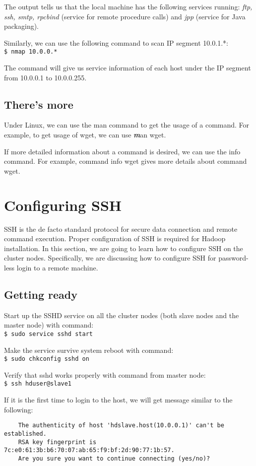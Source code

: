 The output tells us that the local machine has the following services running: \emph{ftp, ssh, smtp, rpcbind} (service for remote procedure calls) and \emph{jpp} (service for Java packaging).

Similarly, we can use the following command to scan IP segment 10.0.1.*: \\
\verb|$ nmap 10.0.0.*|

The command will give us service information of each host under the IP segment from 10.0.0.1 to 10.0.0.255.

\subsection*{There's more}
Under Linux, we can use the man command to get the usage of a command. For example, to get usage of wget, we can use {\emph \textbf man wget}.

If more detailed information about a command is desired, we can use the info command. For example, command info wget gives more details about command wget.

\section{Configuring SSH}
SSH is the de facto standard protocol for secure data connection and remote command execution. Proper configuration of SSH is required for Hadoop installation. In this section, we are going to learn how to configure SSH on the cluster nodes. Specifically, we are discussing how to configure SSH for password-less login to a remote machine.

\subsection*{Getting ready}
Start up the SSHD service on all the cluster nodes (both slave nodes and the master node) with command: \\
\verb|$ sudo service sshd start|

Make the service survive system reboot with command: \\
\verb|$ sudo chkconfig sshd on|

Verify that sshd works properly with command from master node: \\
\verb|$ ssh hduser@slave1|

If it is the first time to login to the host, we will get message similar to the following:
\begin{verbatim}
    The authenticity of host 'hdslave.host(10.0.0.1)' can't be established.
    RSA key fingerprint is 7c:e0:61:3b:b6:70:07:ab:65:f9:bf:2d:90:77:1b:57.
    Are you sure you want to continue connecting (yes/no)?
\end{verbatim}

